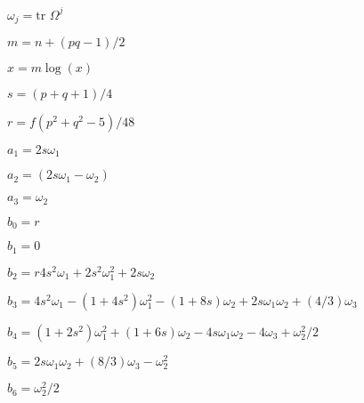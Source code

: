 $\omega_j = \text{tr } \Omega^j$


$m=n+(pq-1)/2$

$x= m \log(x)$


%

$s=(p+q+1)/4$

$r=f (p^2+q^2-5)/48$

\vspace{0.3cm}

$  a_1=2 s  \omega_1 $

$  a_2= (2 s  \omega_1 - \omega_2) $

$  a_3=  \omega_2 $

\vspace{0.3cm}

$  b_0= r $

$  b_1=0 $

$  b_2= r 4s^2 \omega_1 + 2s^2 \omega_1^2 + 2s \omega_2 $

$  b_3=4 s^2 \omega_1 - (1+4 s^2) \omega_1^2 - (1+8s) \omega_2 + 2 s  \omega_1 \omega_2 + (4/3)  \omega_3 $

$  b_4=(1 + 2s^2) \omega_1^2 + (1+6s)\omega_2 - 4s\omega_1\omega_2- 4\omega_3 + \omega_2^2/2 $

$  b_5 = 2s\omega_1\omega_2 + (8/3)\omega_3 - \omega_2^2 $

$  b_6=\omega_2^2/2 $

